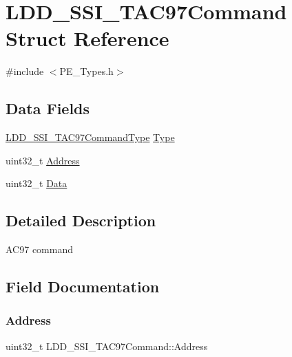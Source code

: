 \hypertarget{struct_l_d_d___s_s_i___t_a_c97_command}{}\section{L\+D\+D\+\_\+\+S\+S\+I\+\_\+\+T\+A\+C97\+Command Struct Reference}
\label{struct_l_d_d___s_s_i___t_a_c97_command}


{\ttfamily \#include $<$P\+E\+\_\+\+Types.\+h$>$}

\subsection*{Data Fields}
\begin{DoxyCompactItemize}
\item 
\hyperlink{group___p_e___types__module_gac7398329f7fdf5c8834b026e63f5edc2}{L\+D\+D\+\_\+\+S\+S\+I\+\_\+\+T\+A\+C97\+Command\+Type} \hyperlink{struct_l_d_d___s_s_i___t_a_c97_command_ac7226beaf57a764f71faf7e822e27a6e}{Type}
\item 
uint32\+\_\+t \hyperlink{struct_l_d_d___s_s_i___t_a_c97_command_a0d39df5cae85e73b036af81e9fbc6332}{Address}
\item 
uint32\+\_\+t \hyperlink{struct_l_d_d___s_s_i___t_a_c97_command_abc16535d09d61f2c3f885adf91632117}{Data}
\end{DoxyCompactItemize}


\subsection{Detailed Description}
A\+C97 command 

\subsection{Field Documentation}
\mbox{\label{struct_l_d_d___s_s_i___t_a_c97_command_a0d39df5cae85e73b036af81e9fbc6332}} 
\subsubsection{\texorpdfstring{Address}{Address}}
{\footnotesize\ttfamily uint32\+\_\+t L\+D\+D\+\_\+\+S\+S\+I\+\_\+\+T\+A\+C97\+Command\+::\+Address}

